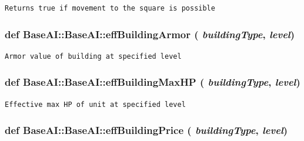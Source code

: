 \footnotesize\begin{verbatim}Returns true if movement to the square is possible
\end{verbatim}
\normalsize
 \hypertarget{classBaseAI_1_1BaseAI_634977ac1854b93727b2bd6298ad2f56}{
\subsubsection[{effBuildingArmor}]{\setlength{\rightskip}{0pt plus 5cm}def BaseAI::BaseAI::effBuildingArmor ( {\em buildingType}, \/   {\em level})}}
\label{classBaseAI_1_1BaseAI_634977ac1854b93727b2bd6298ad2f56}




\footnotesize\begin{verbatim}Armor value of building at specified level
\end{verbatim}
\normalsize
 \hypertarget{classBaseAI_1_1BaseAI_cc15a4773a869b4d07cca9f153e4bd03}{
\subsubsection[{effBuildingMaxHP}]{\setlength{\rightskip}{0pt plus 5cm}def BaseAI::BaseAI::effBuildingMaxHP ( {\em buildingType}, \/   {\em level})}}
\label{classBaseAI_1_1BaseAI_cc15a4773a869b4d07cca9f153e4bd03}




\footnotesize\begin{verbatim}Effective max HP of unit at specified level
\end{verbatim}
\normalsize
 \hypertarget{classBaseAI_1_1BaseAI_da46b6cfd17f40ab4486661143cf8429}{
\subsubsection[{effBuildingPrice}]{\setlength{\rightskip}{0pt plus 5cm}def BaseAI::BaseAI::effBuildingPrice ( {\em buildingType}, \/   {\em level})}}
\label{classBaseAI_1_1BaseAI_da46b6cfd17f40ab4486661143cf8429}




